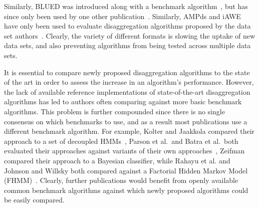\documentclass{sig-alternate}
\newcommand{\bluecolor}[1]{\textcolor{blue}{#1}}
\begin{document}
Similarly, BLUED was introduced along with a benchmark algorithm~\cite{blued}, but has since only been used by one other publication~\cite{anderson_2012}. Similarly, AMPds and iAWE have only been used to evaluate disaggregation algorithms proposed by the data set authors~\cite{ampds,iawe}. Clearly, the variety of different formats is slowing the uptake of new data sets, and also preventing algorithms from being tested across multiple data sets. 

It is essential to compare newly proposed disaggregation algorithms to the state of the art in order to assess the increase in an algorithm's performance. However, the lack of available reference implementations of state-of-the-art disaggregation algorithms has led to authors often comparing against more basic benchmark algorithms. This problem is further compounded since there is no single consensus on which benchmarks to use, and as a result most publications use a different benchmark algorithm. For example, Kolter and Jaakkola compared their approach to a set of decoupled HMMs~\cite{kolter_2012}, Parson et al.\ and Batra et al.\ both evaluated their approaches against variants of their own approaches~\cite{parson_2012,batra_2013}, Zeifman compared their approach to a Bayesian classifier, while Rahayu et al. and Johnson and Willsky both compared against a Factorial Hidden Markov Model (FHMM)~\cite{rahayu_2012,johnson_2013}. Clearly, further publications would benefit from openly available common benchmark algorithms against which newly proposed algorithms could be easily compared.

\end{document}
